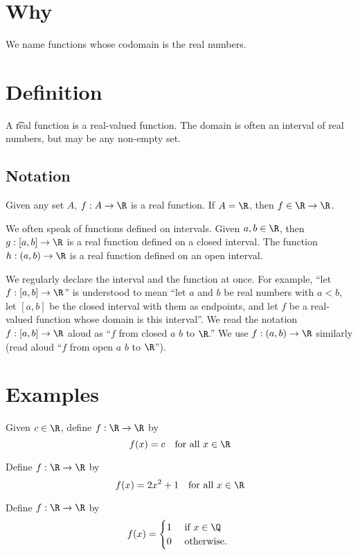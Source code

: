 
\section*{Why}

We name functions whose codomain is the real numbers.

\section*{Definition}

A \t{real function} is a real-valued function.
The domain is often an interval of real numbers, but may be any non-empty set.

\subsection*{Notation}

Given any set $A$, $f: A \to \R $ is a real function.
If $A = \R $, then $f \in \R  \to \R $.

We often speak of functions defined on intervals.
Given $a, b \in \R $, then $g: [a, b] \to \R $ is a real function defined on a closed interval.
The function $h: (a, b) \to \R $ is a real function defined on an open interval.

We regularly declare the interval and the function at once.
For example, ``let $f: [a, b] \to \R $'' is understood to mean ``let $a$ and $b$ be real numbers with $a < b$, let $[a, b]$ be the closed interval with them as endpoints, and let $f$ be a real-valued function whose domain is this interval''.
We read the notation $f: [a, b] \to \R $ aloud as ``$f$ from closed $a$ $b$ to $\R $.''
We use $f: (a, b) \to \R $ similarly (read aloud ``$f$ from open $a$ $b$ to $\R $'').

\section*{Examples}

\begin{example}
Given $c \in \R $, define $f: \R  \to \R $ by
\[
f(x) = c \quad \text{for all } x \in \R
\]
\end{example}

\begin{example}
Define $f: \R  \to \R $ by
\[
f(x) = 2x^2 + 1 \quad \text{for all } x \in \R
\]
\end{example}

\begin{example}
Define $f: \R  \to \R $ by
\[
f(x) = \begin{cases}
1 & \text{ if } x \in \Q  \\
0 & \text{ otherwise. }
\end{cases}
\]
\end{example}
